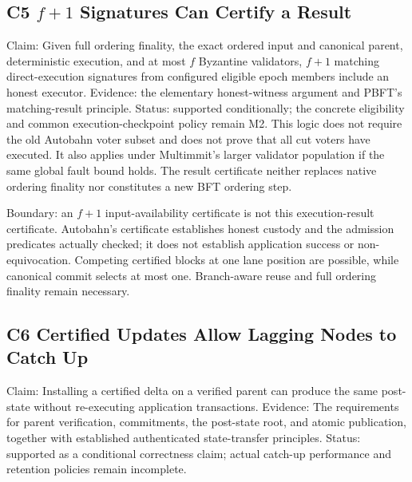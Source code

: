 \documentclass[11pt]{article}
\begin{document}
\subsection*{C5 \(f+1\) Signatures Can Certify a Result}

Claim: Given full ordering finality, the exact ordered input and canonical parent, deterministic execution, and at most \(f\) Byzantine validators, \(f+1\) matching direct-execution signatures from configured eligible epoch members include an honest executor. Evidence: the elementary honest-witness argument and PBFT's matching-result principle. Status: supported conditionally; the concrete eligibility and common execution-checkpoint policy remain M2. This logic does not require the old Autobahn voter subset and does not prove that all cut voters have executed. It also applies under Multimmit's larger validator population if the same global fault bound holds. The result certificate neither replaces native ordering finality nor constitutes a new BFT ordering step. \citep{pbft}


Boundary: an \(f+1\) input-availability certificate is not this execution-result certificate. Autobahn's certificate establishes honest custody and the admission predicates actually checked; it does not establish application success or non-equivocation. Competing certified blocks at one lane position are possible, while canonical commit selects at most one. Branch-aware reuse and full ordering finality remain necessary. \citep[Sections 4--5 and Appendix A.4]{autobahn}

\subsection*{C6 Certified Updates Allow Lagging Nodes to Catch Up}

Claim: Installing a certified delta on a verified parent can produce the same post-state without re-executing application transactions. Evidence: The requirements for parent verification, commitments, the post-state root, and atomic publication, together with established authenticated state-transfer principles. Status: supported as a conditional correctness claim; actual catch-up performance and retention policies remain incomplete. \citep{pbft}
\end{document}
